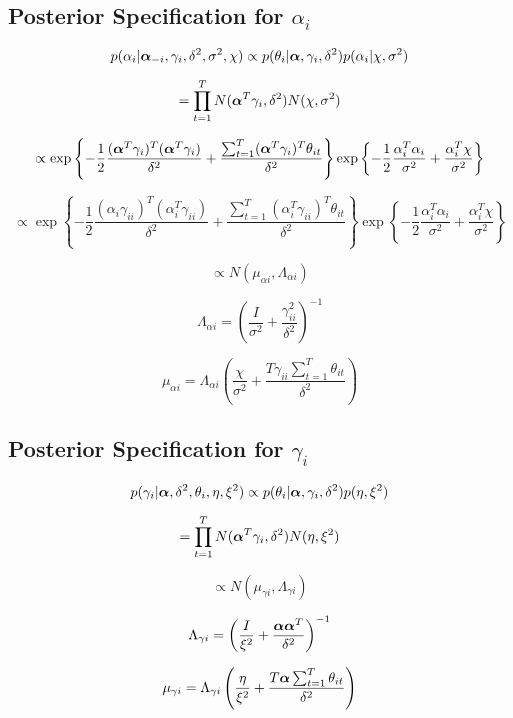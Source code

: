 \documentclass[a4paper]{article}
\begin{document}
\subsection{Posterior Specification for $\alpha_i$}

\[p(\alpha_i | \text{\boldmath$\alpha$}_{-i}, \gamma_i, \delta^2, \sigma^2, \chi) \propto p(\theta_i | \text{\boldmath$\alpha$}, \gamma_i, \delta^2) p(\alpha_i | \chi, \sigma^2)\]

\[= \prod_{t=1}^T N(\text{\boldmath$\alpha$}^T \gamma_i, \delta^2) N(\chi, \sigma^2)\]

\[\propto \exp\left\{-\frac{1}{2}\frac{(\text{\boldmath$\alpha$}^T \gamma_i)^T (\text{\boldmath$\alpha$}^T \gamma_i)}{\delta^2} + \frac{\sum_{t=1}^T (\text{\boldmath$\alpha$}^T \gamma_i)^T \theta_{it}}{\delta^2}\right\} \exp\left\{-\frac{1}{2}\frac{\alpha_i^T \alpha_i}{\sigma^2} + \frac{\alpha_i^T \chi}{\sigma^2}\right\}\]

\[\propto  \exp\left\{-\frac{1}{2}\frac{(\alpha_i \gamma_{ii})^T (\alpha_i^T \gamma_{ii})}{\delta^2} + \frac{\sum_{t=1}^T (\alpha_i^T \gamma_{ii})^T \theta_{it}}{\delta^2}\right\} \exp\left\{-\frac{1}{2}\frac{\alpha_i^T \alpha_i}{\sigma^2} + \frac{\alpha_i^T \chi}{\sigma^2}\right\}\]

\[\propto N(\mu_{\alpha i}, \Lambda_{\alpha i})\]

\[\Lambda_{\alpha i} = \left(\frac{I}{\sigma^2} + \frac{\gamma_{ii}^2}{\delta^2}\right)^{-1}\]

\[\mu_{\alpha i} = \Lambda_{\alpha i} \left(\frac{\chi}{\sigma^2} + \frac{T \gamma_{ii} \sum_{t=1}^T \theta_{it}}{\delta^2}\right)\]


\subsection{Posterior Specification for $\gamma_i$}

\[p(\gamma_i | \text{\boldmath$\alpha$}, \delta^2, \theta_i, \eta, \xi^2) \propto p(\theta_i | \text{\boldmath$\alpha$}, \gamma_i, \delta^2)p(\eta, \xi^2)\]

\[= \prod_{t=1}^T N(\text{\boldmath$\alpha$}^T \gamma_i, \delta^2) N(\eta, \xi^2)\]

\[\propto N(\mu_{\gamma i}, \Lambda_{\gamma i})\]

\[\Lambda_{\gamma i} = \left(\frac{I}{\xi^2} + \frac{\text{\boldmath$\alpha$}\text{\boldmath$\alpha$}^T}{\delta^2}\right)^{-1}\]

\[\mu_{\gamma i} = \Lambda_{\gamma i} \left(\frac{\eta}{\xi^2} + \frac{T\text{\boldmath$\alpha$} \sum_{t=1}^T \theta_{it}}{\delta^2}\right)\]
\end{document}
